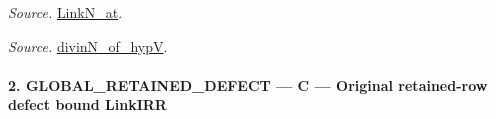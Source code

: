 \documentclass[11pt,a4paper]{article}
\numberwithin{equation}{section}
\theoremstyle{remark}\newtheorem{remark}[theorem]{Remark}
\begin{document}
\emph{Source.} \href{https://github.com/CocoSgt/riemann-hypothesis-lean/blob/7cbf7a0c32fca1badf05931879a37c3f8a2b03b4/src/Formalism/SharpRestriction/GlobalTheoremInputs.lean#L40-L44}{LinkN\_\allowbreak at}.

\emph{Source.} \href{https://github.com/CocoSgt/riemann-hypothesis-lean/blob/7cbf7a0c32fca1badf05931879a37c3f8a2b03b4/src/Development/AutomorphicArithmetic/CharacterBoxes/DivinNOfHypV.lean#L117-L134}{divinN\_\allowbreak of\_\allowbreak hypV}.



\paragraph{2. GLOBAL\_\allowbreak RETAINED\_\allowbreak DEFECT — C — Original retained-row defect bound LinkIRR}
\end{document}
